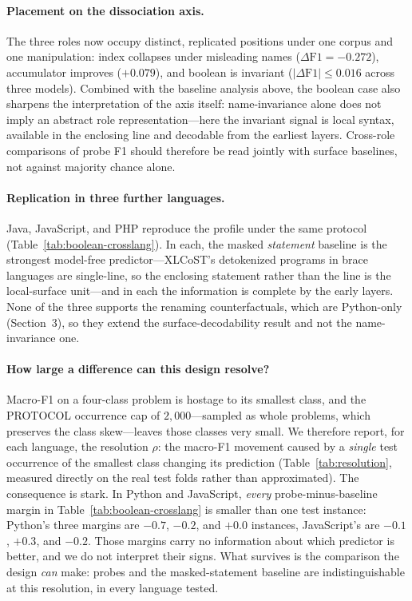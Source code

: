\paragraph{Placement on the dissociation axis.} The three roles now occupy
distinct, replicated positions under one corpus and one manipulation:
index collapses under misleading names ($\Delta\mathrm{F1}=-0.272$),
accumulator improves ($+0.079$), and boolean is invariant
($|\Delta\mathrm{F1}| \le 0.016$ across three models). Combined with the
baseline analysis above, the boolean case also sharpens the interpretation
of the axis itself: name-invariance alone does not imply an abstract role
representation---here the invariant signal is local syntax, available in
the enclosing line and decodable from the earliest layers. Cross-role
comparisons of probe F1 should therefore be read jointly with surface
baselines, not against majority chance alone.

\paragraph{Replication in three further languages.} Java, JavaScript, and
PHP reproduce the profile under the same protocol
(Table~\ref{tab:boolean-crosslang}). In each, the masked \emph{statement}
baseline is the strongest model-free predictor---XLCoST's detokenized
programs in brace languages are single-line, so the enclosing statement
rather than the line is the local-surface unit---and in each the
information is complete by the early layers. None of the three supports
the renaming counterfactuals, which are Python-only (Section~3), so they
extend the surface-decodability result and not the name-invariance one.

\paragraph{How large a difference can this design resolve?}
Macro-F1 on a four-class problem is hostage to its smallest class, and the
PROTOCOL occurrence cap of $2{,}000$---sampled as whole problems, which
preserves the class skew---leaves those classes very small. We therefore
report, for each language, the resolution $\rho$: the macro-F1 movement
caused by a \emph{single} test occurrence of the smallest class changing
its prediction (Table~\ref{tab:resolution}, measured directly on the real
test folds rather than approximated). The consequence is stark. In Python
and JavaScript, \emph{every} probe-minus-baseline margin in
Table~\ref{tab:boolean-crosslang} is smaller than one test instance:
Python's three margins are $-0.7$, $-0.2$, and $+0.0$ instances,
JavaScript's are $-0.1$, $+0.3$, and $-0.2$. Those margins carry no
information about which predictor is better, and we do not interpret their
signs. What survives is the comparison the design \emph{can} make: probes
and the masked-statement baseline are indistinguishable at this
resolution, in every language tested.

